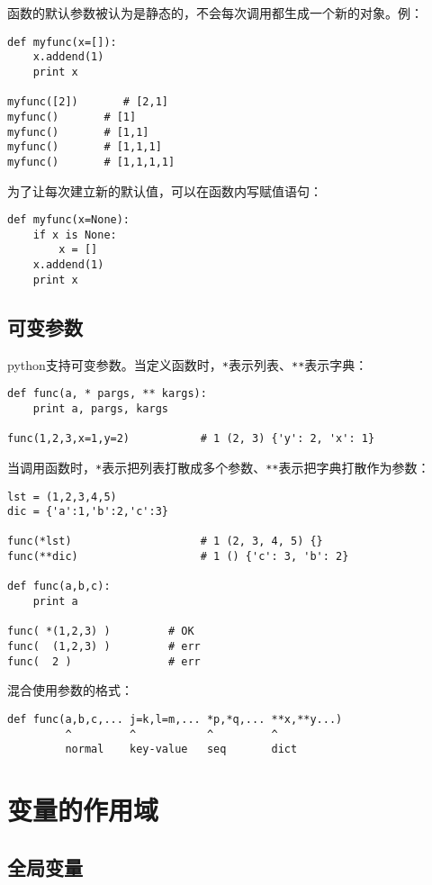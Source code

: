 		函数的默认参数被认为是静态的，不会每次调用都生成一个新的对象。例：
\begin{lstlisting}
def myfunc(x=[]):
	x.addend(1)
	print x

myfunc([2])       # [2,1]
myfunc()       # [1]
myfunc()       # [1,1]
myfunc()       # [1,1,1]
myfunc()       # [1,1,1,1]
\end{lstlisting}

		为了让每次建立新的默认值，可以在函数内写赋值语句：
\begin{lstlisting}
def myfunc(x=None):
	if x is None:
		x = []
	x.addend(1)
	print x
\end{lstlisting}


		\subsection{可变参数}
			python支持可变参数。当定义函数时，\verb|*|表示列表、\verb|**|表示字典：

\begin{lstlisting}
def func(a, * pargs, ** kargs):
    print a, pargs, kargs

func(1,2,3,x=1,y=2)           # 1 (2, 3) {'y': 2, 'x': 1}
\end{lstlisting}

			当调用函数时，\verb|*|表示把列表打散成多个参数、\verb|**|表示把字典打散作为参数：
\begin{lstlisting}
lst = (1,2,3,4,5)
dic = {'a':1,'b':2,'c':3}

func(*lst)                    # 1 (2, 3, 4, 5) {}
func(**dic)                   # 1 () {'c': 3, 'b': 2}

def func(a,b,c):
	print a

func( *(1,2,3) )         # OK
func(  (1,2,3) )         # err
func(  2 )               # err
\end{lstlisting}

			混合使用参数的格式：

\begin{lstlisting}
def func(a,b,c,... j=k,l=m,... *p,*q,... **x,**y...)
         ^         ^           ^         ^
         normal    key-value   seq       dict
\end{lstlisting}

\section{变量的作用域}

\subsection{全局变量}

